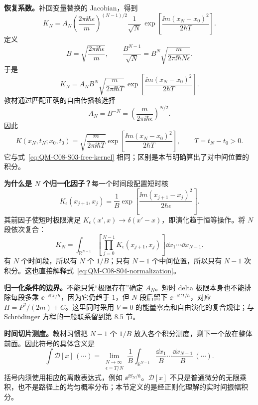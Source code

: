\textbf{恢复系数。}补回变量替换的 Jacobian，得到
\begin{equation}
  K_N=A_N\left(\frac{2\pi\ii\hbar\epsilon}{m}\right)^{(N-1)/2}
    \frac1{\sqrt N}\,
    \exp\!\left[\frac{\ii m(x_N-x_0)^2}{2\hbar T}\right].
\end{equation}
定义
\begin{equation}
  B=\sqrt{\frac{2\pi\ii\hbar\epsilon}{m}},\qquad
  \frac{B^{N-1}}{\sqrt N}
  =B^N\sqrt{\frac{m}{2\pi\ii\hbar N\epsilon}}.
\end{equation}
于是
\begin{equation}
  K_N=A_NB^N\sqrt{\frac{m}{2\pi\ii\hbar T}}\,
    \exp\!\left[\frac{\ii m(x_N-x_0)^2}{2\hbar T}\right].
\end{equation}
教材通过匹配正确的自由传播核选择
\begin{equation}
  \boxed{A_N=B^{-N}
    =\left(\frac{m}{2\pi\ii\hbar\epsilon}\right)^{N/2}}.
  \label{eq:QM-C08-S04-normalization}
\end{equation}
因此
\begin{equation}
  \boxed{K(x_N,t_N;x_0,t_0)
    =\sqrt{\frac{m}{2\pi\ii\hbar T}}
      \exp\!\left[\frac{\ii m(x_N-x_0)^2}{2\hbar T}\right]},
  \qquad T=t_N-t_0>0.
  \label{eq:QM-C08-S04-free-kernel}
\end{equation}
它与式~\eqref{eq:QM-C08-S03-free-kernel} 相同；区别是本节明确算出了对中间位置的积分。

\textbf{为什么是 $N$ 个归一化因子？}每一个时间段配置短时核
\begin{equation}
  K_\epsilon(x_{j+1},x_j)=\frac1B
    \exp\!\left[\frac{\ii m(x_{j+1}-x_j)^2}{2\hbar\epsilon}\right].
\end{equation}
其前因子使短时极限满足 $K_\epsilon(x',x)\to\delta(x'-x)$，即演化趋于恒等操作。将 $N$ 段依次复合：
\begin{equation}
  K_N=\int_{\mathbb R^{N-1}}\left[
    \prod_{j=0}^{N-1}K_\epsilon(x_{j+1},x_j)\right]
    \dd x_1\cdots\dd x_{N-1}.
\end{equation}
有 $N$ 个时间段，所以有 $N$ 个 $1/B$；只有 $N-1$ 个中间位置，所以只有 $N-1$ 次积分。这也直接解释式~\eqref{eq:QM-C08-S04-normalization}。

\textbf{归一化条件的边界。}不能只凭“极限存在”确定 $A_N$。短时 delta 极限本身也不能排除每段多乘 $\ee^{-\ii C\epsilon/\hbar}$，因为它仍趋于 $1$，但 $N$ 段后留下 $\ee^{-\ii CT/\hbar}$，对应 $H=P^2/(2m)+C$。这里同时采用 $V=0$ 的能量零点和自由演化的复合规律；与 Schrödinger 方程的一般联系留到第 8.5 节。

\textbf{时间切片测度。}教材习惯把 $N-1$ 个 $1/B$ 放入各个积分测度，剩下一个放在整体前面。因此符号的具体含义是
\begin{equation}
  \boxed{\int\mathcal D[x]\,(\cdots)
    =\lim_{\substack{N\to\infty\\\epsilon=T/N}}
      \frac1B\int_{\mathbb R^{N-1}}
      \frac{\dd x_1}{B}\cdots\frac{\dd x_{N-1}}B\,(\cdots)}.
\end{equation}
括号内须使用相应的离散表达式，例如 $\ee^{\ii S_N/\hbar}$。$\mathcal D[x]$ 不只是普通微分的无限乘积，也不是路径上的均匀概率分布；本节定义的是经正则化理解的实时间振幅积分。


